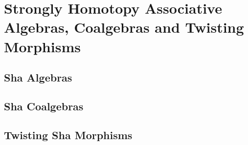 \documentclass[../thesis.tex]{subfiles}
\begin{document}
    \section{Strongly Homotopy Associative Algebras, Coalgebras and Twisting Morphisms}

        \subsection{Sha Algebras}

        \subsection{Sha Coalgebras}

        \subsection{Twisting Sha Morphisms}
\end{document}

